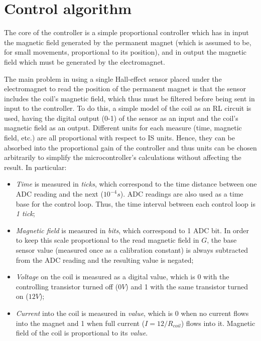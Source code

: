 \section{Control algorithm}
The core of the controller is a simple proportional controller which has in input the magnetic field generated by the permanent magnet (which is assumed to be, for small movements, proportional to its position), and in output the magnetic field which must be generated by the electromagnet.

The main problem in using a single Hall-effect sensor placed under the electromagnet to read the position of the permanent magnet is that the sensor includes the coil's magnetic field, which thus must be filtered before being sent in input to the controller. To do this, a simple model of the coil as an RL circuit is used, having the digital output (0-1) of the sensor as an input and the coil's magnetic field as an output. Different units for each measure (time, magnetic field, etc.) are all proportional with respect to IS units. Hence, they can be absorbed into the proportional gain of the controller and thus units can be chosen arbitrarily to simplify the microcontroller's calculations without affecting the result. In particular:

\begin{itemize}
  \item{\emph{Time} is measured in \emph{ticks}, which correspond to the time distance between one ADC reading and the next ($10^{-4}s$). ADC readings are also used as a time base for the control loop. Thus, the time interval between each control loop is \emph{1 tick};}
  \item{\emph{Magnetic field} is measured in \emph{bits}, which correspond to 1 ADC bit. In order to keep this scale proportional to the read magnetic field in $G$, the base sensor value (measured once as a calibration constant) is always subtracted from the ADC reading and the resulting value is negated;}
  \item{\emph{Voltage} on the coil is measured as a digital value, which is 0 with the controlling transistor turned off ($0V$) and 1 with the same transistor turned on ($12V$);}
  \item{\emph{Current} into the coil is measured in \emph{value}, which is 0 when no current flows into the magnet and 1 when full current ($I=12/R_{coil}$) flows into it. Magnetic field of the coil is proportional to its \emph{value}.}
\end{itemize}

